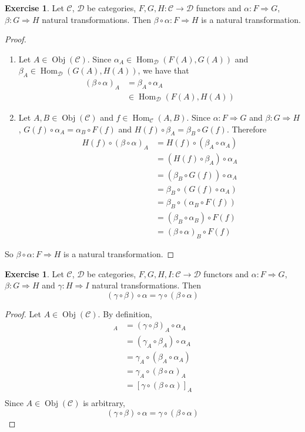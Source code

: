\documentclass{book}
\theoremstyle{definition}
\newtheorem{ex}[definition]{Exercise}
\newcommand{\al}{\alpha}
\newcommand{\be}{\beta}
\newcommand{\gam}{\gamma}
\newcommand{\MC}{\mathcal{C}}
\newcommand{\MD}{\mathcal{D}}
\newcommand{\lex}[1]{\label{ex:#1}}
\DeclareMathOperator{\Obj}{Obj}
\DeclareMathOperator{\Hom}{Hom}
\DeclareMathOperator*{\0}{\mbf{0}}
\DeclareMathOperator*{\1}{\mbf{1}}
\begin{document}
	\begin{ex}  \lex{14003}
		Let $\MC$, $\MD$ be categories, $F, G, H:\MC \rightarrow \MD$ functors and $\al: F \Rightarrow G$, $\be : G \Rightarrow H$ natural transformations. Then $ \be \circ \al: F \Rightarrow H$ is a natural transformation.
	\end{ex}
	
	\begin{proof}\
		\begin{enumerate}
			\item Let $A \in \Obj(\MC)$. Since $\al_A \in \Hom_{\MD}(F(A), G(A))$ and $\be_A \in \Hom_{\MD}(G(A), H(A))$, we have that 
			\begin{align*}
				(\be \circ \al)_A 
				& = \be_A \circ \al_A \\
				& \in \Hom_{\MD}(F(A), H(A))
			\end{align*}
			\item Let $A,B \in \Obj(\MC)$ and $f \in \Hom_{\MC}(A,B)$. Since $\al:F \Rightarrow G$ and $\be: G \Rightarrow H$, $G(f) \circ \al_A = \al_B \circ F(f)$ and $H(f) \circ \be_A = \be_B \circ G(f)$. Therefore 
			\begin{align*}
				H(f) \circ (\be \circ \al)_A
				& = H(f) \circ (\be_A \circ \al_A) \\
				& = (H(f) \circ \be_A) \circ \al_A \\
				& = (\be_B \circ G(f)) \circ \al_A \\
				& = \be_B \circ (G(f)\circ \al_A) \\
				& = \be_B \circ (\al_B \circ F(f)) \\
				& = (\be_B \circ \al_B) \circ F(f) \\
				& = (\be \circ \al)_B \circ F(f)
			\end{align*}
		\end{enumerate}
		So $\be \circ \al: F \Rightarrow H$ is a natural transformation. 
	\end{proof}

	\begin{ex} \lex{14003.1}
		Let $\MC$, $\MD$ be categories, $F, G, H, I:\MC \rightarrow \MD$ functors and $\al: F \Rightarrow G$, $\be : G \Rightarrow H$ and $\gam: H \Rightarrow I$ natural transformations. Then $$(\gam \circ \be) \circ \al = \gam \circ (\be \circ \al)$$
	\end{ex}

	\begin{proof}
		Let $A \in \Obj(\MC)$. By definition,  
		\begin{align*}
			[(\gam \circ \be) \circ \al]_{A} 
			& = (\gam \circ \be)_A \circ \al_{A} \\
			& = (\gam_A \circ \be_A) \circ \al_A \\
			& = \gam_A \circ (\be_A \circ \al_A) \\
			& = \gam_A \circ (\be \circ \al)_A \\
			& = [\gam \circ (\be \circ \al)]_A \\
		\end{align*}
		Since $A \in \Obj(\MC)$ is arbitrary, 
		$$(\gam \circ \be) \circ \al = \gam \circ (\be \circ \al)$$
	\end{proof}
\end{document}
